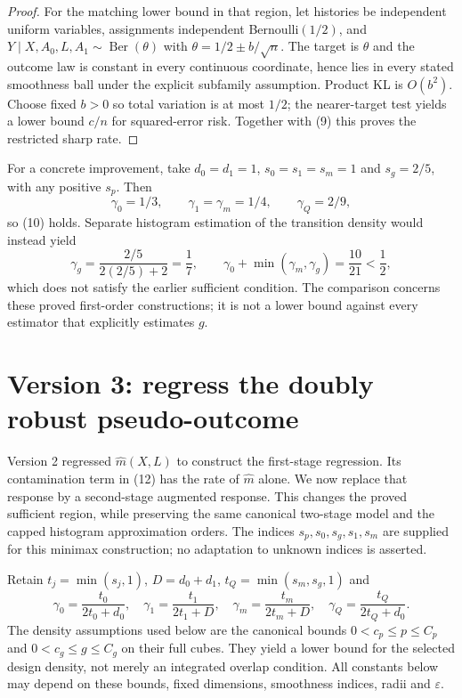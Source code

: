 \documentclass[11pt]{article}
\theoremstyle{definition}
\begin{document}
\begin{proof}
For the matching lower bound in that region, let histories be independent
uniform variables, assignments independent Bernoulli$(1/2)$, and
$Y\mid X,A_0,L,A_1\sim\operatorname{Ber}(\theta)$ with
$\theta=1/2\pm b/\sqrt n$. The target is $\theta$ and the outcome
law is constant in every continuous coordinate, hence lies in every
stated smoothness ball under the explicit subfamily assumption. Product
KL is $O(b^2)$. Choose fixed $b>0$ so total variation is at most $1/2$;
the nearer-target test yields a lower bound $c/n$ for squared-error risk.
Together with (9) this proves the restricted sharp rate.
\end{proof}

For a concrete improvement, take $d_0=d_1=1$, $s_0=s_1=s_m=1$ and
$s_g=2/5$, with any positive $s_p$. Then
\[
 \gamma_0=1/3,\qquad \gamma_1=\gamma_m=1/4,\qquad \gamma_Q=2/9,
\]
so (10) holds. Separate histogram estimation of the transition density
would instead yield
\[
 \gamma_g=\frac{2/5}{2(2/5)+2}=\frac17,\qquad
 \gamma_0+\min(\gamma_m,\gamma_g)=\frac{10}{21}<\frac12,
\]
which does not satisfy the earlier sufficient condition.
The comparison concerns these proved first-order constructions; it is not
a lower bound against every estimator that explicitly estimates $g$.

\section*{Version 3: regress the doubly robust pseudo-outcome}
Version 2 regressed $\widehat m(X,L)$ to construct the first-stage
regression. Its contamination term in (12) has the rate of $\widehat m$
alone. We now replace that response by a second-stage augmented response.
This changes the proved sufficient region, while preserving the same
canonical two-stage model and the capped histogram approximation orders.
The indices $s_p,s_0,s_g,s_1,s_m$ are supplied for this minimax construction;
no adaptation to unknown indices is asserted.

Retain $t_j=\min(s_j,1)$, $D=d_0+d_1$,
$t_Q=\min(s_m,s_g,1)$ and
\[
 \gamma_0=\frac{t_0}{2t_0+d_0},\quad
 \gamma_1=\frac{t_1}{2t_1+D},\quad
 \gamma_m=\frac{t_m}{2t_m+D},\quad
 \gamma_Q=\frac{t_Q}{2t_Q+d_0}.
\]
The density assumptions used below are the canonical bounds
$0<c_p\le p\le C_p$ and $0<c_g\le g\le C_g$ on their full cubes.
They yield a lower bound for the selected design density, not merely an
integrated overlap condition. All constants below may depend on these
bounds, fixed dimensions, smoothness indices, radii and $\varepsilon$.
\end{document}
